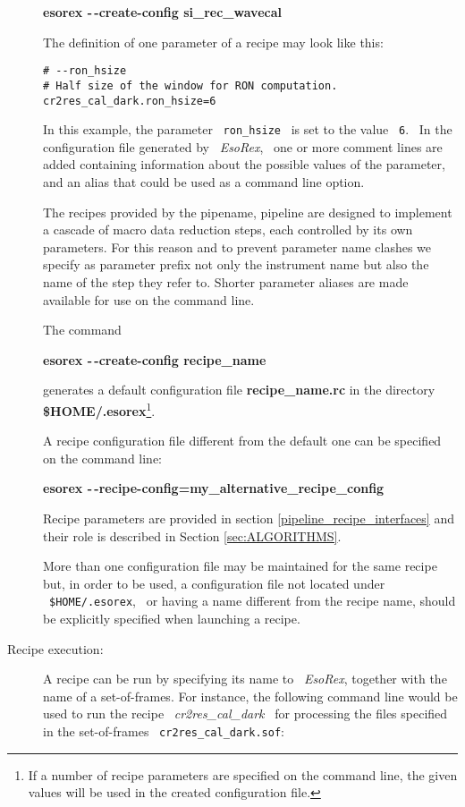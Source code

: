 \begin{description}
{\bf esorex -\,-create-config si\_rec\_wavecal}

The definition of one parameter of a recipe may look like this:
\begin{verbatim}
# --ron_hsize
# Half size of the window for RON computation.
cr2res_cal_dark.ron_hsize=6
\end{verbatim}


In this example, the parameter \ {\tt ron\_hsize} 
\ is set to the value \ {\tt 6}. \ In the configuration file
generated by \ {\it EsoRex}, \ one or more comment lines are added
containing information about the possible values of the parameter, and
an alias that could be used as a command line option.  

The recipes provided by the pipename, pipeline are designed to implement 
a cascade of macro data reduction steps, each controlled by 
its own parameters.
For this reason and to prevent parameter name clashes we specify as 
parameter prefix not only the instrument name but also the name of the 
step they refer to. Shorter parameter aliases are made available for 
use on the command line.

The command

{\bf esorex -\,-create-config recipe\_name}

generates a default configuration file {\bf recipe\_name.rc} in the directory 
{\bf \${HOME}/.esorex}\footnote{If a number of recipe parameters are 
specified on the command line, the given values will be used in the
created configuration file.}.

A recipe configuration file different from the default one can be 
specified on the command line:

{\bf esorex -\,-recipe-config=my\_alternative\_recipe\_config}


Recipe parameters are provided in section \ref{pipeline_recipe_interfaces} 
and their role is described in Section \ref{sec:ALGORITHMS}.

More than one configuration file may be maintained for the same recipe
but, in order to be used, a configuration file not located under 
\ {\tt \$HOME/.esorex}, \ or having a name different from the recipe 
name, should be explicitly specified when launching a recipe.


\item [Recipe execution:]


A recipe can be run by specifying its name to 
\ {\it EsoRex}, together with the name of a set-of-frames.
For instance, the
following command line would be used to run the recipe \ {\it cr2res\_cal\_dark}
\ for processing the files specified in the set-of-frames 
\ {\tt cr2res\_cal\_dark.sof}:


\end{description}
